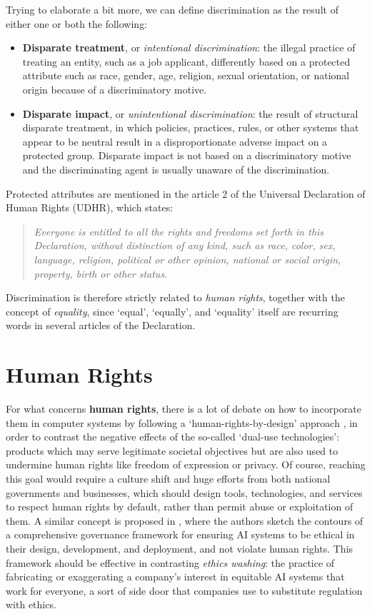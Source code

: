 Trying to elaborate a bit more, we can define discrimination as the result of either one or both the following:
\begin{itemize}
\item \textbf{Disparate treatment}, or \textit{intentional discrimination}: the illegal practice of treating an entity, such as a job applicant, differently based on a protected attribute such as race, gender, age, religion, sexual orientation, or national origin because of a discriminatory motive.
\item \textbf{Disparate impact}, or \textit{unintentional discrimination}: the result of structural disparate treatment, in which policies, practices, rules, or other systems that appear to be neutral result in a disproportionate adverse impact on a protected group. Disparate impact is not based on a discriminatory motive and the discriminating agent is usually unaware of the discrimination.
\end{itemize}

Protected attributes are mentioned in the article 2 of the Universal Declaration of Human Rights (UDHR), which states:
\begin{quote}\emph{Everyone is entitled to all the rights and freedoms set forth in this Declaration, without distinction of any kind, such as race, color, sex, language, religion, political or other opinion, national or social origin, property, birth or other status.} \cite{assembly1948universal}\end{quote}
Discrimination is therefore strictly related to \textit{human rights}, together with the concept of \textit{equality}, since `equal', `equally', and `equality' itself are recurring words in several articles of the Declaration.


\section{Human Rights}
For what concerns \textbf{human rights}, there is a lot of debate on how to incorporate them in computer systems by following a `human-rights-by-design' approach \cite{penney2018advancing}, in order to contrast the negative effects of the so-called `dual-use technologies': products which may serve legitimate societal objectives but are also used to undermine human rights like freedom of expression or privacy. Of course, reaching this goal would require a culture shift and huge efforts from both national governments and businesses, which should design tools, technologies, and services to respect human rights by default, rather than permit abuse or exploitation of them.
A similar concept is proposed in \cite{yeung2020ai}, where the authors sketch the contours of a comprehensive governance framework for ensuring AI systems to be ethical in their design, development, and deployment, and not violate human rights. This framework should be effective in contrasting \textit{ethics washing}: the practice of fabricating or exaggerating a company's interest in equitable AI systems that work for everyone, a sort of side door that companies use to substitute regulation with ethics.

